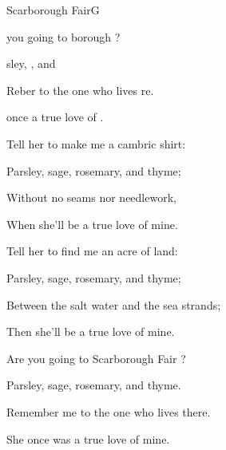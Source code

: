 \begin{song}{Scarborough Fair}{G}{}

\begin{SBVerse}

 you going to borough  ?

sley, ,  and 

Reber to the one who lives re.

 once  a true love of .

\end{SBVerse}

\begin{SBVerse}

Tell her to make me a cambric shirt:

Parsley, sage, rosemary, and thyme;

Without no seams nor needlework,

When she'll be a true love of mine.

\end{SBVerse}

\begin{SBVerse}

Tell her to find me an acre of land:

Parsley, sage, rosemary, and thyme;

Between the salt water and the sea strands;

Then she'll be a true love of mine.

\end{SBVerse}

\begin{SBVerse}

Are you going to Scarborough Fair ?

Parsley, sage, rosemary, and thyme.

Remember me to the one who lives there.

She once was a true love of mine.

\end{SBVerse}

\end{song}

\clearpage
